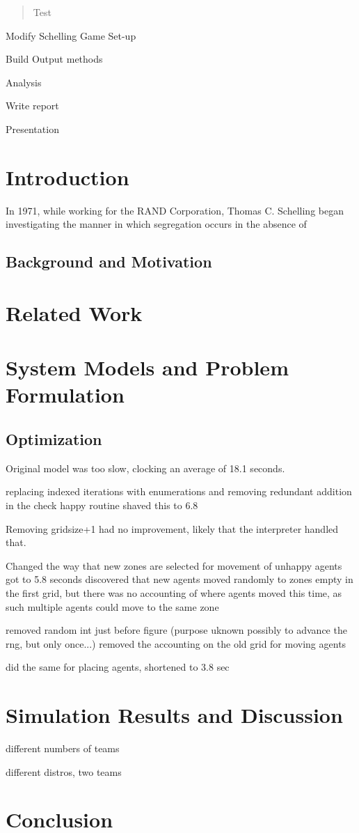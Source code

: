\documentclass[12pt]{IEEEtran}
\begin{document}
	
	\begin{abstract}
		Test
	\end{abstract}


Modify Schelling Game Set-up

Build Output methods

Analysis

Write report

Presentation

\section{Introduction}

In 1971, while working for the RAND Corporation, Thomas C. Schelling began investigating
the manner in which segregation occurs in the absence of 
\cite{Schelling_1971}

\subsection{Background and Motivation}

\section{Related Work}

\section{System Models and Problem Formulation}
\subsection{Optimization}

Original model was too slow, clocking an average of 18.1 seconds.

replacing indexed iterations with enumerations and 
removing redundant addition in the check happy routine shaved this to 6.8

Removing gridsize+1 had no improvement, likely that the interpreter handled that.

Changed the way that new zones are selected for movement of unhappy agents got to 5.8 seconds
discovered that new agents moved randomly to zones empty in the first grid, but there was no accounting
of where agents moved this time, as such multiple agents could move to the same zone

removed random int just before figure (purpose uknown possibly to advance the rng, but only once...)
removed the accounting on the old grid for moving agents


did the same for placing agents, shortened to 3.8 sec


\section{Simulation Results and Discussion}

different numbers of teams

different distros, two teams



\section{Conclusion}










	
\end{document}
